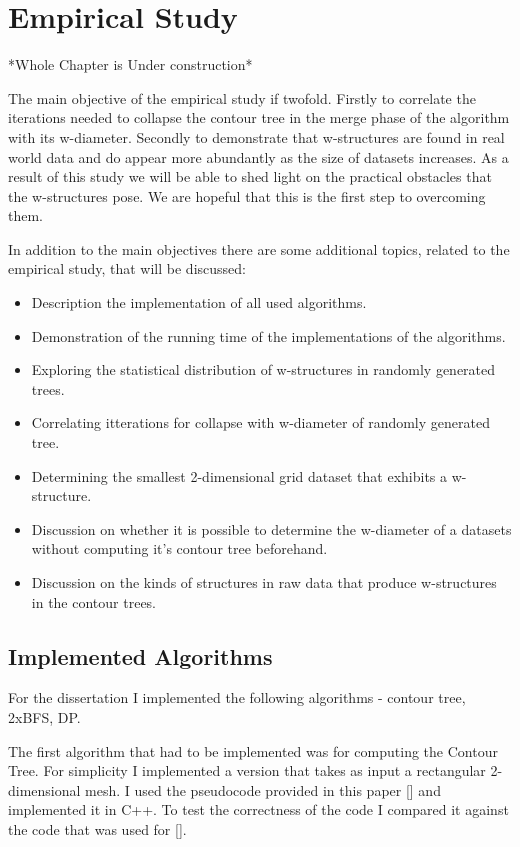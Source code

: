 \chapter{Empirical Study}
\label{chapter3}

*Whole Chapter is Under construction* 


The main objective of the empirical study if twofold. Firstly to correlate the iterations needed to collapse the contour tree in the merge phase of the algorithm with its w-diameter. Secondly to demonstrate that w-structures are found in real world data and do appear more abundantly as the size of datasets increases. As a result of this study we will be able to shed light on the practical obstacles that the w-structures pose. We are hopeful that this is the first step to overcoming them.

In addition to the main objectives there are some additional topics, related to the empirical study, that will be discussed:

\begin{itemize}
    \item Description the implementation of all used algorithms.
    \item Demonstration of the running time of the implementations of the algorithms.
    \item Exploring the statistical distribution of w-structures in randomly generated trees.
    \item Correlating itterations for collapse with w-diameter of randomly generated tree.
    \item Determining the smallest 2-dimensional grid dataset that exhibits a w-structure.
    \item Discussion on whether it is possible to determine the w-diameter of a datasets without computing it's contour tree beforehand.
    \item Discussion on the kinds of structures in raw data that produce w-structures in the contour trees.
\end{itemize}


\section{Implemented Algorithms}

For the dissertation I implemented the following algorithms - contour tree, 2xBFS, DP.

The first algorithm that had to be implemented was for computing the Contour Tree. For simplicity I implemented a version that takes as input a rectangular 2-dimensional mesh. I used the pseudocode provided in this paper [] and implemented it in C++. To test the correctness of the code I compared it against the code that was used for [].

